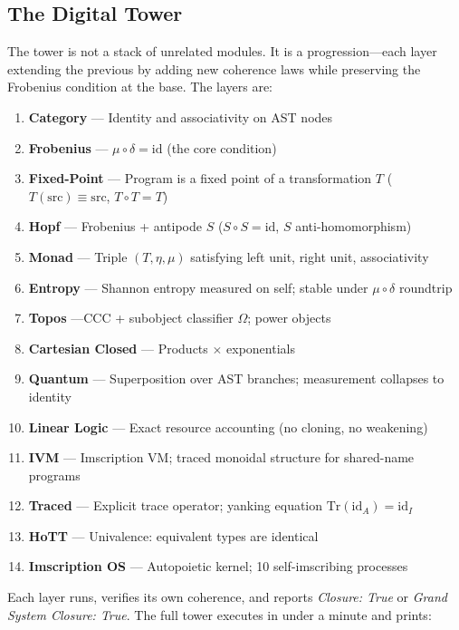 \documentclass[12pt,a4paper]{article}
\begin{document}
\subsection{The Digital Tower}

The tower is not a stack of unrelated modules. It is a progression---each layer extending the previous by adding new coherence laws while preserving the Frobenius condition at the base. The layers are:

\begin{enumerate}
    \item \textbf{Category} --- Identity and associativity on AST nodes
    \item \textbf{Frobenius} --- $\mu \circ \delta = \mathrm{id}$ (the core condition)
    \item \textbf{Fixed-Point} --- Program is a fixed point of a transformation $T$ ($T(\mathrm{src}) \equiv \mathrm{src}$, $T \circ T = T$)
    \item \textbf{Hopf} --- Frobenius + antipode $S$ ($S \circ S = \mathrm{id}$, $S$ anti-homomorphism)
    \item \textbf{Monad} --- Triple $(T, \eta, \mu)$ satisfying left unit, right unit, associativity
    \item \textbf{Entropy} --- Shannon entropy measured on self; stable under $\mu \circ \delta$ roundtrip
    \item \textbf{Topos} ---CCC + subobject classifier $\Omega$; power objects
    \item \textbf{Cartesian Closed} --- Products $\times$ exponentials
    \item \textbf{Quantum} --- Superposition over AST branches; measurement collapses to identity
    \item \textbf{Linear Logic} --- Exact resource accounting (no cloning, no weakening)
    \item \textbf{IVM} --- Imscription VM; traced monoidal structure for shared-name programs
    \item \textbf{Traced} --- Explicit trace operator; yanking equation $\mathrm{Tr}(\mathrm{id}_A) = \mathrm{id}_I$
    \item \textbf{HoTT} --- Univalence: equivalent types are identical
    \item \textbf{Imscription OS} --- Autopoietic kernel; 10 self-imscribing processes
\end{enumerate}

Each layer runs, verifies its own coherence, and reports \emph{Closure: True} or \emph{Grand System Closure: True}. The full tower executes in under a minute and prints:
\end{document}
